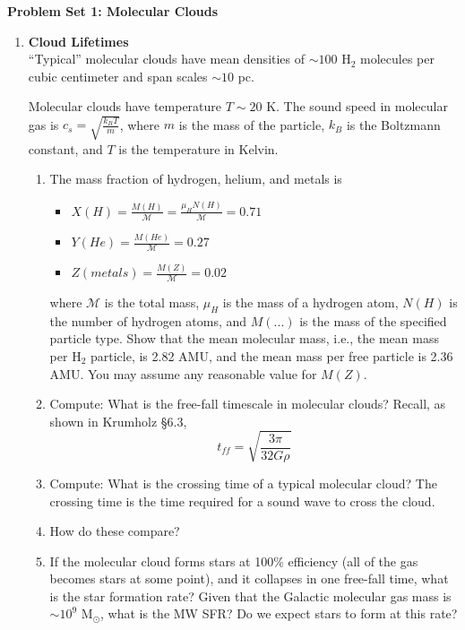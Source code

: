 \documentclass{article}
\newcommand{\msun}{\ensuremath{\mathrm{M}_\odot}\xspace}
\begin{document}
\noindent\textbf{Problem Set 1: Molecular Clouds}

\begin{enumerate}
    \item \textbf{Cloud Lifetimes}\\
``Typical'' molecular clouds have mean densities of $\sim100$ H$_2$ molecules per
cubic centimeter and span scales $\sim10$ pc.


Molecular clouds have temperature $T\sim20$ K.
The sound speed in molecular gas is $c_s = \sqrt{\frac{k_B T}{m}}$, where $m$ is the
mass of the particle, $k_B$ is the Boltzmann constant, and $T$ is the
temperature in Kelvin.

\begin{enumerate}
    \item The mass fraction of hydrogen, helium, and metals is\citep{Kauffmann2008}
        \begin{itemize}
            \item $X(H)=\frac{M(H)}{\mathcal{M}}=\frac{\mu_H N(H)}{\mathcal{M}}=0.71$
            \item $Y(He)=\frac{M(He)}{\mathcal{M}}=0.27$
            \item $Z(metals)=\frac{M(Z)}{\mathcal{M}}=0.02$
        \end{itemize}
        where $\mathcal{M}$ is the total mass, $\mu_H$ is the mass of a
        hydrogen atom, $N(H)$ is the number of hydrogen atoms, and $M(...)$ is the mass of the specified particle type.
        Show that the mean molecular mass, i.e., the mean mass per H$_2$
        particle, is 2.82 AMU, and the mean mass per free particle is 2.36 AMU.
        You may assume any reasonable value for $M(Z)$.
    \item Compute: What is the free-fall timescale in molecular clouds?  
        Recall, as shown in Krumholz \S6.3,
        $$t_{ff} = \sqrt{\frac{3 \pi}{32 G \rho}}$$
    \item Compute: What is the crossing time of a typical molecular cloud?  The
        crossing time is the time required for a sound wave to cross the cloud.
    \item How do these compare?
    \item If the molecular cloud forms stars at 100\% efficiency (all of the
        gas becomes stars at some point), and it collapses in one free-fall
        time, what is the star formation rate?
        Given that the Galactic molecular gas mass is $\sim10^9$ \msun, what is the MW SFR?
        Do we expect stars to form at this rate?
\end{enumerate}


\end{enumerate}
\end{document}
